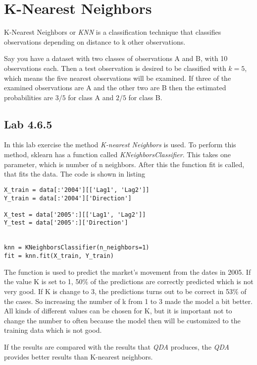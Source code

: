 \section{K-Nearest Neighbors}
K-Nearest Neighbors or \emph{KNN} is a classification technique that classifies observations depending on distance to k other observations. 

Say you have a dataset with two classes of observations A and B, with 10 observations each. Then a test observation is desired to be classified with $k=5$, which means the five nearest observations will be examined. If three of the examined observations are A and the other two are B then the estimated probabilities are $3/5$ for class A and $2/5$ for class B. 

\subsection{Lab 4.6.5}

In this lab exercise the method \emph{K-nearest Neighbors} is used. To perform this method, sklearn has a function called \emph{KNeighborsClassifier}. This takes one parameter, which is number of n neighbors. After this the function fit is called, that fits the data.
The code is shown in listing

\begin{lstlisting}[caption={Python K-Nearest neighbors function, where K is set to 1}, label=lst:kneighbor, mathescape=true]
X_train = data[:'2004'][['Lag1', 'Lag2']]
Y_train = data[:'2004']['Direction']

X_test = data['2005':][['Lag1', 'Lag2']]
Y_test = data['2005':]['Direction']


knn = KNeighborsClassifier(n_neighbors=1)
fit = knn.fit(X_train, Y_train)
\end{lstlisting}

The function is used to predict the market's movement from the dates in 2005. If the value K is set to 1, 50\% of the predictions are correctly predicted which is not very good.
If K is change to 3, the predictions turns out to be correct in 53\% of the cases. So increasing the number of k from 1 to 3 made the model a bit better. All kinds of different values can be chosen for K, but it is important not to change the number to often because the model then will be customized to the training data which is not good.

If the results are compared with the results that \emph{QDA} produces, the \emph{QDA} provides better results than K-nearest neighbors.